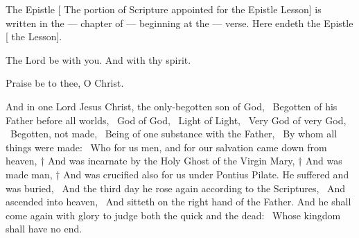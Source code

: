The Epistle [ The portion of Scripture appointed for the Epistle  Lesson] is written in the --- chapter of --- beginning at the --- verse. 
 Here endeth the Epistle [ the Lesson].
\smallskip
\medskip
\medskip

\V The Lord be with you. \R And with thy spirit. %


\centerline{}
\centerline{Praise be to thee, O Christ.}



\bigskip



And in one Lord Jesus Christ, the only-begotten son of God, \ Begotten of his Father before all worlds, \ God of God, \ Light of Light, \ Very God of very God, \ Begotten, not made, \ Being of one substance with the Father, \ By whom all things were made: \ Who for us men, and for our salvation came down from heaven, † And was incarnate by the Holy Ghost of the Virgin Mary, † And was made man, † And was crucified also for us under Pontius Pilate. He suffered and was buried, \ And the third day he rose again according to the Scriptures, \ And ascended into heaven, \ And sitteth on the right hand of the Father. And he shall come again with glory to judge both the quick and the dead: \ Whose kingdom shall have no end.

